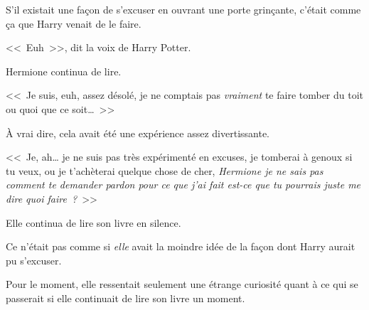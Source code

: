S'il existait une façon de s'excuser en ouvrant une porte grinçante, c'était comme ça que Harry venait de le faire.

<<~Euh~>>, dit la voix de Harry Potter.

Hermione continua de lire.

<<~Je suis, euh, assez désolé, je ne comptais pas \emph{vraiment} te faire tomber du toit ou quoi que ce soit…~>>

À vrai dire, cela avait été une expérience assez divertissante.

<<~Je, ah… je ne suis pas très expérimenté en excuses, je tomberai à genoux si tu veux, ou je t'achèterai quelque chose de cher, \emph{Hermione je ne sais pas comment te demander pardon pour ce que j'ai fait est-ce que tu pourrais juste me dire quoi faire~?}~>>

Elle continua de lire son livre en silence.

Ce n'était pas comme si \emph{elle} avait la moindre idée de la façon dont Harry aurait pu s'excuser.

Pour le moment, elle ressentait seulement une étrange curiosité quant à ce qui se passerait si elle continuait de lire son livre un moment.
